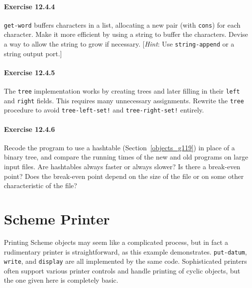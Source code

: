 \paragraph{Exercise \label{examples_g173}12.4.4}


\label{examples_s28}\texttt{get-word} buffers characters in a list, allocating a new pair
(with \texttt{cons}) for each character.
Make it more efficient by using a string to buffer the characters.
Devise a way to allow the string to grow if necessary.
[\textit{Hint}: Use \texttt{string-append} or a string output port.]


\paragraph{Exercise \label{examples_g174}12.4.5}


\label{examples_s29}The \texttt{tree} implementation works by creating trees and later filling
in their \texttt{left} and \texttt{right} fields.
This requires many unnecessary assignments.
Rewrite the \texttt{tree} procedure to avoid \texttt{tree-left-set!} and
\texttt{tree-right-set!} entirely.


\paragraph{Exercise \label{examples_g175}12.4.6}


\label{examples_s30}Recode the program to use a hashtable (Section \ref{objects_g119})
in place of a binary tree, and
compare the running times of the new and old programs on large input files.
Are hashtables always faster or always slower?
Is there a break-even point?
Does the break-even point depend on the size of the file or on some
other characteristic of the file?



\section{\label{examples_g176}\label{examples_h5}Scheme Printer\label{examples_SECTEXPRINTER}}



Printing Scheme objects may seem like a complicated process, but
in fact a rudimentary printer is straightforward, as this
example demonstrates.
\label{examples_s31}\texttt{put-datum},
\label{examples_s32}\texttt{write},
and \label{examples_s33}\texttt{display} are all implemented by the same code.
Sophisticated printers often support various printer
controls and handle printing of cyclic objects, but the one given
here is completely basic.


